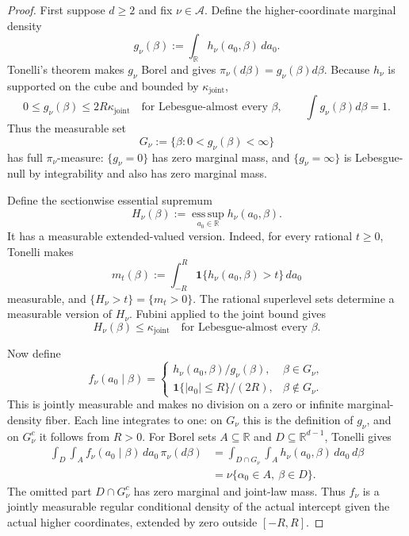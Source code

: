 \begin{proof}
First suppose $d\geq2$ and fix $\nu\in\mathcal A$.  Define the
higher-coordinate marginal density
\[
g_\nu(\beta):=\int_{\mathbb R}h_\nu(a_0,\beta)\,da_0.
\]
Tonelli's theorem makes $g_\nu$ Borel and gives
$\pi_\nu(d\beta)=g_\nu(\beta)d\beta$.  Because $h_\nu$ is supported on
the cube and bounded by $\kappa_{\mathrm{joint}}$,
\[
0\leq g_\nu(\beta)\leq2R\kappa_{\mathrm{joint}}
\quad\text{for Lebesgue-almost every }\beta,
\qquad
\int g_\nu(\beta)d\beta=1.
\]
Thus the measurable set
\[
G_\nu:=\{\beta:0<g_\nu(\beta)<\infty\}
\]
has full $\pi_\nu$-measure: $\{g_\nu=0\}$ has zero marginal mass, and
$\{g_\nu=\infty\}$ is Lebesgue-null by integrability and also has zero
marginal mass.

Define the sectionwise essential supremum
\[
H_\nu(\beta)
:=\operatorname*{ess\,sup}_{a_0\in\mathbb R}
h_\nu(a_0,\beta).
\]
It has a measurable extended-valued version.  Indeed, for every rational
$t\geq0$, Tonelli makes
\[
m_t(\beta):=\int_{-R}^{R}
\mathbf1\{h_\nu(a_0,\beta)>t\}\,da_0
\]
measurable, and
$\{H_\nu>t\}=\{m_t>0\}$.  The rational superlevel sets determine a
measurable version of $H_\nu$.  Fubini applied to the joint bound gives
\[
H_\nu(\beta)\leq\kappa_{\mathrm{joint}}
\quad\text{for Lebesgue-almost every }\beta.
\]

Now define
\[
f_\nu(a_0\mid\beta)=
\begin{cases}
h_\nu(a_0,\beta)/g_\nu(\beta),&\beta\in G_\nu,\\[4pt]
\mathbf1\{|a_0|\leq R\}/(2R),&\beta\notin G_\nu.
\end{cases}
\]
This is jointly measurable and makes no division on a zero or infinite
marginal-density fiber.  Each line integrates to one: on $G_\nu$ this is
the definition of $g_\nu$, and on $G_\nu^c$ it follows from $R>0$.
For Borel sets $A\subseteq\mathbb R$ and
$D\subseteq\mathbb R^{d-1}$, Tonelli gives
\[
\begin{aligned}
\int_D\int_A f_\nu(a_0\mid\beta)\,da_0\,\pi_\nu(d\beta)
&=\int_{D\cap G_\nu}\int_A
 h_\nu(a_0,\beta)\,da_0\,d\beta\\
&=\nu\{\alpha_0\in A,\ \beta\in D\}.
\end{aligned}
\]
The omitted part $D\cap G_\nu^c$ has zero marginal and joint-law mass.
Thus $f_\nu$ is a jointly measurable regular conditional density of the
actual intercept given the actual higher coordinates, extended by zero
outside $[-R,R]$.


\end{proof}
